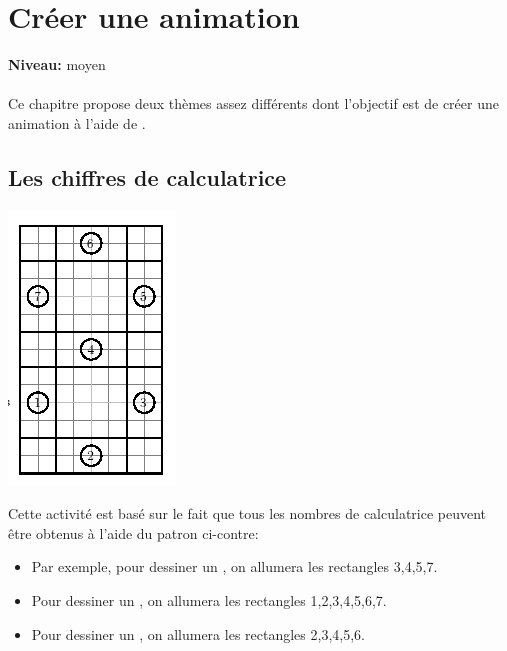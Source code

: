 \chapter{Créer une animation}
{ }\hfill\textbf{Niveau:} moyen\\ \\
Ce chapitre propose deux thèmes assez différents dont l'objectif est de créer une animation à l'aide de \xlogo.
\section{Les chiffres de calculatrice}
\begin{center}
\includegraphics{images/animation-chiffre.png}
\end{center}

\noindent Cette activité est basé sur le fait que tous les nombres de calculatrice peuvent être obtenus à l'aide du patron ci-contre:
\begin{itemize}
\item Par exemple, pour dessiner un \fg, on allumera les rectangles 3,4,5,7.
\item Pour dessiner un \fg, on allumera les rectangles 1,2,3,4,5,6,7.
\item Pour dessiner un \fg, on allumera les rectangles 2,3,4,5,6.
\end{itemize}

